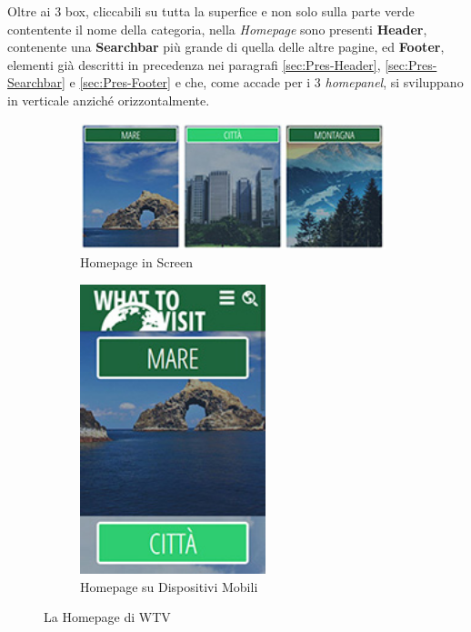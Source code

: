 Oltre ai 3 box, cliccabili su tutta la superfice e non solo sulla parte verde contentente il nome della categoria, nella \textit{Homepage} sono presenti \textbf{Header}, contenente una \textbf{Searchbar} più grande di quella delle altre pagine, ed \textbf{Footer}, elementi già descritti in precedenza nei paragrafi \ref{sec:Pres-Header}, \ref{sec:Pres-Searchbar} e \ref{sec:Pres-Footer} e che, come accade per i 3 \textit{homepanel}, si sviluppano in verticale anziché orizzontalmente.
\begin{figure}[h!]
        \centering
        \begin{subfigure}[b]{0.3\textwidth}
                \includegraphics[height=3.7cm,width=8.9cm]{images/pres_home.jpg}
                \caption{Homepage in Screen}
                \label{fig:Home-screen}
        \end{subfigure}
        \hspace{4cm}
        \begin{subfigure}[b]{0.3\textwidth}
                \includegraphics[height=8.43cm,width=5.4cm]{images/pres_home_m.jpg}
                \caption{Homepage su Dispositivi Mobili}
                \label{fig:Home-mobile}
        \end{subfigure}
        \caption{La Homepage di WTV}\label{fig:Display-Home}
\end{figure}

